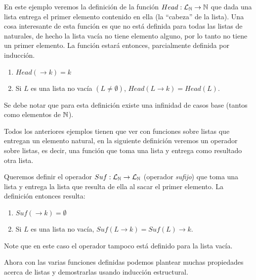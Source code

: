 \begin{ejemplo}
En este ejemplo veremos la definición de la función $Head:\mathcal{L}_{\mathbb{N}}\rightarrow\mathbb{N}$ que dada una lista entrega el primer elemento contenido en ella (la ``cabeza'' de la lista).
Una cosa interesante de esta función es que no está definida para todas las listas de naturales, de hecho la lista vacía no tiene elemento alguno, por lo tanto no tiene un primer elemento.
La función estará entonces, parcialmente definida por inducción.
\begin{enumerate}
\itemsep 0pt
\item $Head(\rightarrow k)=k$
\item Si $L$ es una lista no vacía $(L\not=\emptyset)$, $Head(L\rightarrow k)=Head(L)$.
\end{enumerate}
Se debe notar que para esta definición existe una infinidad de casos base (tantos como elementos de $\mathbb{N}$).
\end{ejemplo}

Todos los anteriores ejemplos tienen que ver con funciones sobre listas que entregan un elemento natural, en la siguiente definición veremos un operador sobre listas, es decir, una función que toma una lista y entrega como resultado otra lista.

\begin{ejemplo}
Queremos definir el operador $Suf:\mathcal{L}_{\mathbb{N}}\rightarrow\mathcal{L}_{\mathbb{N}}$ (operador \emph{sufijo}) que toma una lista y entrega la lista que resulta de ella al sacar el primer elemento.
La definición entonces resulta:
\begin{enumerate}
\itemsep 0pt
\item $Suf(\rightarrow k)=\emptyset$
\item Si $L$ es una lista no vacía, $Suf(L\rightarrow k)=Suf(L)\rightarrow k$.
\end{enumerate}
Note que en este caso el operador tampoco está definido para la lista vacía.
\end{ejemplo}

Ahora con las varias funciones definidas podemos plantear muchas propiedades acerca de listas y demostrarlas usando inducción estructural.

